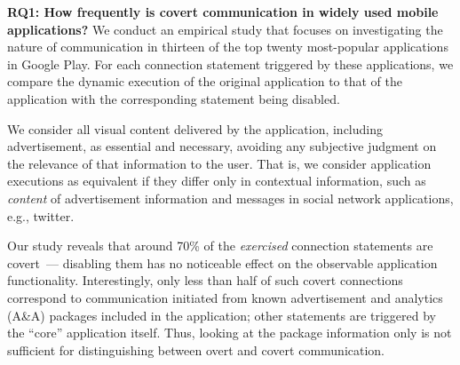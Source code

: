 \noindent 
{\bf RQ1: How frequently is covert communication in widely used mobile applications?} 
We conduct an empirical study that focuses on %
investigating the nature of communication in thirteen of the 
top twenty most-popular applications in Google Play.  
For each connection statement triggered by these applications, we compare the dynamic execution of the original application to that of the application with the corresponding statement being disabled. 

We consider all visual content delivered by the application, including advertisement, as essential and necessary, avoiding any subjective judgment on the relevance of that information to the user.  
That is, we consider application executions as
equivalent if they %
differ only in contextual information, such as   
\emph{content} of advertisement information and messages in social network
applications, e.g., twitter.

Our study reveals that around 70\% of
the \emph{exercised} connection statements are covert~--- disabling
them has no noticeable effect on the observable application
functionality. Interestingly, only less than half of such covert connections correspond to communication initiated from known advertisement and analytics (A\&A) packages included in the application; other statements are triggered by the ``core'' application itself. 
Thus, looking at the package information only is not sufficient for distinguishing between
overt and covert communication. 

